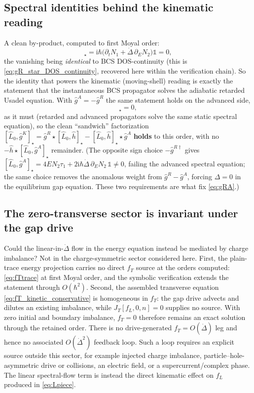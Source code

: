 \documentclass[
  aps,
  prb,
  preprint,
  superscriptaddress,
  longbibliography,
  nofootinbib
]{revtex4-2}
\newcommand{\ii}{\mathrm{i}}
\newcommand{\DOS}{N_1}
\newcommand{\fL}{f_L}
\newcommand{\fT}{f_T}
\newcommand{\hatg}{\hat{g}}
\providecommand{\openone}{}\renewcommand{\openone}{\mathds{1}}
\begin{document}
\subsection{Spectral identities behind the kinematic reading}
\label{sec:spec}

A clean by-product, computed to first Moyal order:
\begin{equation}
  [\hat L_0,\hatg^{R}]_\star=\ii\hbar\bigl(\partial_t\DOS+\dot\Delta\,\partial_EN_2\bigr)\openone=0,
  \label{eq:specR}
\end{equation}
the vanishing being \emph{identical} to BCS DOS-continuity (this is
\cref{eq:gR_star_DOS_continuity}, recovered here within the verification
chain). So the identity that
powers the kinematic (moving-shell) reading is exactly the statement that
the instantaneous BCS
propagator solves the adiabatic retarded Usadel equation. With
$\hatg^A=-\hatg^R$ the same statement holds
on the advanced side,
\begin{equation}
  [\hat L_0,\hatg^{A}]_\star=0 ,
  \label{eq:specA}
\end{equation}
as it must (retarded and advanced propagators solve the same static
spectral equation), so the clean ``sandwich'' factorization
$[\hat L_0,\hatg^K]_\star=\hatg^R\star[\hat L_0,\hat h]_\star-[\hat L_0,\hat h]_\star\star\hatg^A$
\textbf{holds} to this order, with no $-\hat h\star[\hat L_0,\hatg^A]_\star$
remainder. (The opposite sign choice $-\hatg^{R\dagger}$ gives
$[\hat L_0,\hatg^{A}]_\star=4EN_2\tau_1+2\ii\hbar\dot\Delta\,\partial_EN_2\,\openone\neq0$,
failing the advanced spectral equation; the same choice removes the
anomalous weight from
$\hatg^R-\hatg^A$, forcing $\Delta=0$ in
the equilibrium gap equation. These two requirements are what fix
\cref{eq:gRA}.)

\subsection{The zero-transverse sector is invariant under the gap drive}
\label{sec:fT}

Could the linear-in-$\dot\Delta$ flow in the energy equation instead be
mediated by charge imbalance? Not in the charge-symmetric sector considered
here. First,
the plain-trace energy projection carries no direct $\fT$ source at the
orders computed: \cref{eq:fTtrace} at first Moyal order, and the symbolic
verification extends the statement through $O(\hbar^2)$. Second, the
assembled transverse equation \cref{eq:fT_kinetic_conservative} is
homogeneous in $\fT$: the gap drive advects and dilutes an existing
imbalance, while \(J_T[\fL,0,n]=0\) supplies no source. With zero initial and
boundary imbalance, \(\fT=0\) therefore remains an exact solution through
the retained order. There is no drive-generated
\(\fT=O(\dot\Delta)\) leg and hence no associated
\(O(\dot\Delta^2)\) feedback loop. Such a loop requires an explicit source
outside this sector, for example injected charge imbalance,
particle--hole-asymmetric drive or collisions, an electric field, or a
supercurrent/complex phase. The linear spectral-flow term is instead the
direct kinematic effect on \(\fL\) produced in \cref{eq:Lpiece}.
\end{document}
